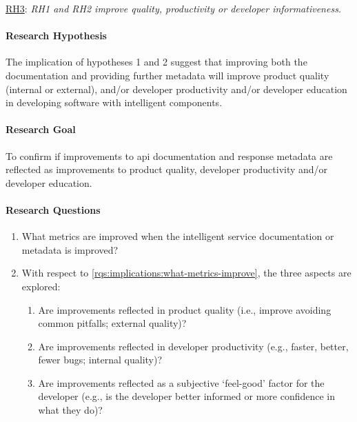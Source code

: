 \begin{titled-frame}{\underline{RH3}: \textit{RH1 and RH2 improve quality,  productivity or developer informativeness.} }
\vspace{-12pt}
\paragraph{Research Hypothesis}
The implication of hypotheses 1 and 2 suggest that improving both the documentation and providing further metadata will improve product quality (internal or external), and/or developer productivity and/or developer education in developing software with intelligent components.

\paragraph{Research Goal}
 To confirm if improvements to \gls{api} documentation and response metadata  are reflected as improvements to product quality, developer productivity and/or developer education.
 
 \paragraph{Research Questions}
\begin{enumerate}[label=\textbf{RQ3.\arabic*.}, ref=RQ3.\arabic*, leftmargin=3.5\parindent, rightmargin=1\parindent]
  \item  What metrics are improved when the intelligent service documentation or metadata is improved?
  \label{rqs:implications:what-metrics-improve}
  
  \item With respect to \ref{rqs:implications:what-metrics-improve}, the three aspects are explored:

  \begin{enumerate}
  \item Are improvements reflected in product quality (i.e., improve avoiding common pitfalls; external quality)?
  \item Are improvements reflected in developer productivity (e.g., faster, better, fewer bugs; internal quality)?
  \item Are improvements reflected as a subjective `feel-good' factor for the developer (e.g., is the developer better informed or more confidence in what they do)?
  \end{enumerate}
  \label{rqs:implications:aspects}  
\end{enumerate}


\end{titled-frame}
